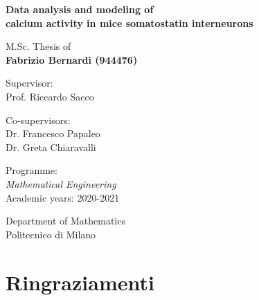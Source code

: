 \documentclass[12pt, a4paper]{report}
\newcommand{\myName}{Fabrizio Bernardi (944476)
}
\newcommand{\myTitle}{Data analysis and modeling of \\ calcium activity in   mice somatostatin interneurons}
\newcommand{\myDegree}{Programme: \protect\\ \textit{Mathematical Engineering} \\
Academic years: 2020-2021}
\newcommand{\myDepartment}{Department of Mathematics}
\newcommand{\myUni}{Politecnico di Milano}
\begin{document}
\begin{titlepage}
\begin{minipage}{\linewidth}
\begin{minipage}{0.45\linewidth}
\begin{figure}[H]
				\end{figure}
			\end{minipage}
		\end{minipage}
		
		\begin{addmargin}[0cm]{-0cm}
			\setlength{\parindent}{0pt}
			\vfill
			
			{\huge\bfseries\myTitle}
			
			\vspace{2cm}
			
			{\Large M.Sc. Thesis of\\[0.125cm]}
			{\LARGE\bfseries\myName}
			
			\vspace{1cm}
			
			\large
			Supervisor:\\[0.125cm]
			{\Large Prof. Riccardo Sacco}
			
			\vspace{0.5cm}
			
			\large
			Co-supervisors:\\[0.125cm]
			{\Large Dr. Francesco Papaleo \\
			Dr. Greta Chiaravalli}
			
			\vspace{1cm}
			
			\myDegree
			
			\vspace{0.5cm}
			
			\myDepartment \\
			\myUni
			
			\vfill
		\end{addmargin}
	\end{titlepage}
	
	
	\chapter*{Ringraziamenti}
	
\end{document}

